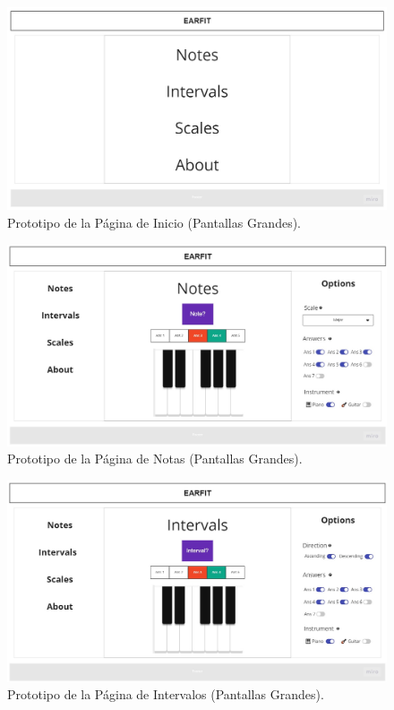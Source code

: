 \documentclass[12pt,twoside,titlepage]{report}
\begin{document}
\begin{figure}[H]
    \centering
    \includegraphics[scale=0.3]{Design Thinking/Prototipo/Large/Menu}
    \caption{Prototipo de la Página de Inicio (Pantallas Grandes).}
    \label{fig:MenuLarge}
\end{figure}

\begin{figure}[H]
    \centering
    \includegraphics[scale=0.29]{Design Thinking/Prototipo/Large/Notes}
    \caption{Prototipo de la Página de Notas (Pantallas Grandes).}
    \label{fig:NotesLarge}
\end{figure}

\begin{figure}[H]
    \centering
    \includegraphics[scale=0.29]{Design Thinking/Prototipo/Large/Intervals}
    \caption{Prototipo de la Página de Intervalos (Pantallas Grandes).}
    \label{fig:IntervalsLarge}
\end{figure}
\end{document}
